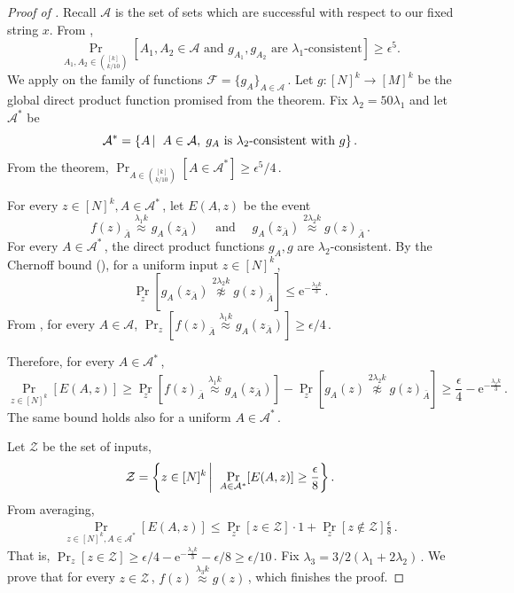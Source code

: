 \documentclass[11pt]{article}
\numberwithin{equation}{section}
\theoremstyle{definition}
\theoremstyle{plain}
\newcommand{\eee}{\mathrm e}
\newcommand{\Paren}[1]{\left(#1\right)} %
\newcommand\sett[2]{\left\{ #1 \left| \; \vphantom{#1 #2} \right. #2  \right\}} %
\newcommand{\set}[1]{\{#1\}} %
\newcommand\f{f} %
\newcommand{\g}{g} %
\newcommand\neql[1]{\stackrel{{#1}}{ \approx}} %
\newcommand\neqg[1]{\stackrel{{#1}}{ \not\approx}} %
\newcommand\rest[1]{{\bar{#1}}}  %
\newcommand\zi{\mathcal{Z}} %
\begin{document}
\begin{proof}[Proof of ]
Recall $\mathcal{A}$ is the 
%
set %
of sets which are successful with respect to our fixed string $x$. From , \[\Pr_{A_1,A_2\in \binom{[k]}{k/10}}[A_1,A_2\in\mathcal{A} \textrm{ and }\g_{A_1},\g_{A_2} \text{ are } \lambda_1\textrm{-consistent}]\geq \epsilon^5.\]
We apply  on the family of functions $\mathcal{F} = \set{\g_A}_{A\in\mathcal{A}}$\,. Let $\g:[N]^k\rightarrow [M]^k$ be the global direct product function promised from the theorem. Fix $\lambda_2 = 50\lambda_1$ and let $\mathcal{A^*}$ be
 \[ \mathcal{A}^* = \sett{A}{A\in\mathcal{A},\;\g_A \text{ is } \lambda_2 \textrm{-consistent with }\g}.\]
From the theorem, $\Pr_{A\in\binom{[k]}{k/10}}[A\in\mathcal{A}^*]\geq 
%
\epsilon^5/4$\,. %

For every $z\in[N]^k,A\in\mathcal{A}^*$\,, let $E(A,z)$ be the event
\[ \f(z)_{\rest{A}}\neql{\lambda_1 k}\g_A(z_{\rest{A}}) \quad\textrm{ and }\quad \g_A(z_{\rest{A}})\neql{2\lambda_2 k}\g(z)_{\rest{A}}\,.\] %
For every $A\in\mathcal{A}^*$\,, the direct product functions $\g_A,\g$ are $\lambda_2$-consistent. By
the  %
Chernoff bound  %
(),   %
for a uniform input $z\in[N]^k$\,,
\[ \Pr_z[\g_A(z_{\rest{A}})\neqg{2\lambda_2 k}\g(z)_{\rest{A}}] \leq \eee^{-\frac{\lambda_2 k}{3}}\,. \]%
From , for every $A\in\mathcal{A}$, $\Pr_z[\f(z)_{\rest{A}}\neql{\lambda_1 k}\g_A(z_{\rest{A}})]\geq
%
\epsilon/4$\,.%

Therefore, for every $A\in\mathcal{A}^*$\,,
\[ \Pr_{z\in[N]^k}[E(A,z)]\geq \Pr_z[\f(z)_{\rest{A}}\neql{\lambda_1 k}\g_A(z_{\rest{A}})] - \Pr_z[\g_A(z)\neqg{2\lambda_2 k}\g(z)_{\rest{A}}] \geq \frac{\epsilon}{4}-\eee^{-\frac{\lambda_2 k}{3}}\,. \]%
The same bound holds also for a uniform $A\in\mathcal{A}^*$\,.


Let $\zi$ be the set of inputs,
\[ \zi = \sett{z\in[N]^k}{\Pr_{A\in\mathcal{A}^*}[E(A,z)]\geq \frac{\epsilon}{8}}.\]
From averaging,
\begin{align*}
   \Pr_{z\in[N]^k,A\in\mathcal{A}^*}[E(A,z)] \leq \Pr_z[z\in \zi]\cdot 1 + \Pr_z[z\notin \zi] \frac{\epsilon}{8}\,.%
\end{align*}
That is, 
%
$\Pr_z[z\in \zi] \geq \epsilon/4- \eee^{-\frac{\lambda_2 k}{3}} - \epsilon/8 \geq \epsilon/10$\,. %
Fix 
%
$\lambda_3 = 3/2\Paren{\lambda_1+2\lambda_2}\,.$ %
We prove that for every $z\in\zi$\,, $\f(z)\neql{\lambda_3 k}\g(z)$\,, which finishes the proof.


\end{proof}
\end{document}
